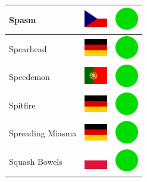 \documentclass[12pt, a4paper, twoside]{report}
\begin{document}
\begin{center}
\begin{longtable}{|p{5cm}|p{2cm}|p{2cm}|}
 Spasm                                                      & \includegraphics[width=1cm]{../4x3/cz} &   \includegraphics[width=1cm]{../likes/y} \\ \hline
 Spearhead                                                  & \includegraphics[width=1cm]{../4x3/de} &   \includegraphics[width=1cm]{../likes/y} \\ \hline
 Speedemon                                                  & \includegraphics[width=1cm]{../4x3/pt} &   \includegraphics[width=1cm]{../likes/y} \\ \hline
 Spitfire                                                   & \includegraphics[width=1cm]{../4x3/de} &   \includegraphics[width=1cm]{../likes/y} \\ \hline
 Spreading Miasma                                           & \includegraphics[width=1cm]{../4x3/de} &   \includegraphics[width=1cm]{../likes/y} \\ \hline
 Squash Bowels                                              & \includegraphics[width=1cm]{../4x3/pl} &   \includegraphics[width=1cm]{../likes/y} \\ \hline

\end{longtable}
\end{center}
\end{document}
